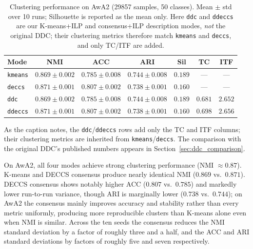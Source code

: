 \begin{table}[H]
    \centering
    \caption{Clustering performance on AwA2 (29857 samples, 50 classes). Mean $\pm$ std over 10 runs; Silhouette is reported as the mean only. Here \texttt{ddc} and \texttt{ddeccs} are our K-means+ILP and consensus+ILP description modes, \emph{not} the original DDC; their clustering metrics therefore match \texttt{kmeans} and \texttt{deccs}, and only TC/ITF are added.}
    \label{tab:awa2_results}
    \begin{tabular}{lcccccc}
        \hline
        \textbf{Mode} & \textbf{NMI} & \textbf{ACC} & \textbf{ARI} & \textbf{Sil} & \textbf{TC} & \textbf{ITF} \\
        \hline
        \texttt{kmeans} & $0.869 \pm 0.002$ & $0.785 \pm 0.008$ & $0.744 \pm 0.008$ & $0.189$ & --- & --- \\
        \texttt{deccs} & $0.871 \pm 0.001$ & $0.807 \pm 0.002$ & $0.738 \pm 0.001$ & $0.160$ & --- & --- \\
        \texttt{ddc} & $0.869 \pm 0.002$ & $0.785 \pm 0.008$ & $0.744 \pm 0.008$ & $0.189$ & $0.681$ & $2.652$ \\
        \texttt{ddeccs} & $0.871 \pm 0.001$ & $0.807 \pm 0.002$ & $0.738 \pm 0.001$ & $0.160$ & $0.698$ & $2.656$ \\
        \hline
    \end{tabular}
\end{table}


As the caption notes, the \texttt{ddc}/\texttt{ddeccs} rows add only the TC and ITF columns; their clustering metrics are inherited from \texttt{kmeans}/\texttt{deccs}. The comparison with the original DDC's published numbers appears in Section~\ref{sec:ddc_comparison}.

On AwA2, all four modes achieve strong clustering performance (NMI $\approx 0.87$). K-means and DECCS consensus produce nearly identical NMI ($0.869$ vs.\ $0.871$). DECCS consensus shows notably higher ACC ($0.807$ vs.\ $0.785$) and markedly lower run-to-run variance, though ARI is marginally lower ($0.738$ vs.\ $0.744$); on AwA2 the consensus mainly improves accuracy and stability rather than every metric uniformly, producing more reproducible clusters than K-means alone even when NMI is similar. Across the ten seeds the consensus reduces the NMI standard deviation by a factor of roughly three and a half, and the ACC and ARI standard deviations by factors of roughly five and seven respectively.

